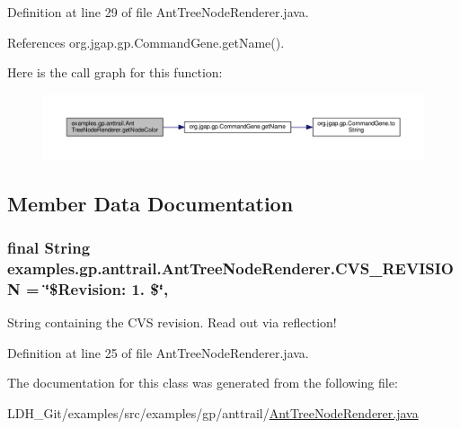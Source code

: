 Definition at line 29 of file Ant\-Tree\-Node\-Renderer.\-java.



References org.\-jgap.\-gp.\-Command\-Gene.\-get\-Name().



Here is the call graph for this function\-:
\nopagebreak
\begin{figure}[H]
\begin{center}
\leavevmode
\includegraphics[width=350pt]{classexamples_1_1gp_1_1anttrail_1_1_ant_tree_node_renderer_a9494dcd8989ba67f7fd156991caf9932_cgraph}
\end{center}
\end{figure}




\subsection{Member Data Documentation}
\hypertarget{classexamples_1_1gp_1_1anttrail_1_1_ant_tree_node_renderer_a2387dd259f2bb4857ec6c45f2954e174}{
\subsubsection[{C\-V\-S\-\_\-\-R\-E\-V\-I\-S\-I\-O\-N}]{\setlength{\rightskip}{0pt plus 5cm}final String examples.\-gp.\-anttrail.\-Ant\-Tree\-Node\-Renderer.\-C\-V\-S\-\_\-\-R\-E\-V\-I\-S\-I\-O\-N = \char`\"{}\$Revision\-: 1. \$\char`\"{}\hspace{0.3cm}{\ttfamily [static]}, {\ttfamily [private]}}}\label{classexamples_1_1gp_1_1anttrail_1_1_ant_tree_node_renderer_a2387dd259f2bb4857ec6c45f2954e174}
String containing the C\-V\-S revision. Read out via reflection! 

Definition at line 25 of file Ant\-Tree\-Node\-Renderer.\-java.



The documentation for this class was generated from the following file\-:\begin{DoxyCompactItemize}
\item 
L\-D\-H\-\_\-\-Git/examples/src/examples/gp/anttrail/\hyperlink{_ant_tree_node_renderer_8java}{Ant\-Tree\-Node\-Renderer.\-java}\end{DoxyCompactItemize}
